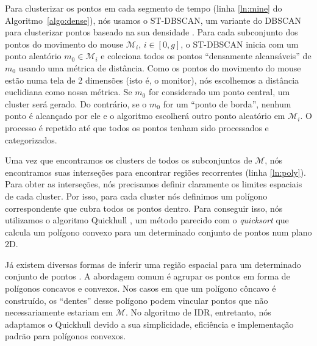 Para clusterizar os pontos em cada segmento de tempo (linha \ref{ln:mine} do Algoritmo~\ref{algo:dense}), nós usamos o ST-DBSCAN, um variante do DBSCAN para clusterizar pontos baseado na sua densidade \cite{Birant:2007}. Para cada subconjunto dos pontos do movimento do mouse $\mathcal{M}_i$, $i \in [0,g]$, o ST-DBSCAN inicia com um ponto aleatório $m_0 \in \mathcal{M}_i$ e coleciona todos os pontos ``densamente alcansáveis'' de $m_0$ usando uma métrica de distância. Como os pontos do movimento do mouse estão numa tela de 2 dimensões (isto é, o monitor), nós escolhemos a distância euclidiana como nossa métrica. Se $m_0$ for considerado um ponto central,  um cluster será gerado. Do contrário, se o $m_0$ for um ``ponto de borda'', nenhum ponto é alcançado por ele e o algoritmo escolherá outro ponto aleatório em $\mathcal{M}_i$. O processo é repetido até que todos os pontos tenham sido processados e categorizados.

Uma vez que encontramos os clusters de todos os subconjuntos de $\mathcal{M}$, nós encontramos suas interseções para encontrar regiões recorrentes (linha \ref{ln:poly}). Para obter as interseções, nós precisamos definir claramente os limites espaciais de cada cluster. Por isso, para cada cluster nós definimos um polígono correspondente que cubra todos os pontos dentro. Para conseguir isso, nós utilizamos o algoritmo Quickhull \cite{Barber:1996} , um método parecido com o \textit{quicksort} que calcula um polígono convexo para um determinado conjunto de pontos num plano 2D.

Já existem diversas formas de inferir uma região espacial para um determinado conjunto de pontos \cite{Bevis1989,DUCKHAM2008,FADILI2004,ARAMPATZIS2006,Galton2006}. A abordagem comum é agrupar os pontos em forma de polígonos concavos e convexos. Nos casos em que um polígono côncavo é construído, os ``dentes'' desse polígono podem vincular pontos que não necessariamente estariam em $\mathcal{M}$. No algoritmo de IDR, entretanto, nós adaptamos o Quickhull devido a sua simplicidade, eficiência e implementação padrão para polígonos convexos.
